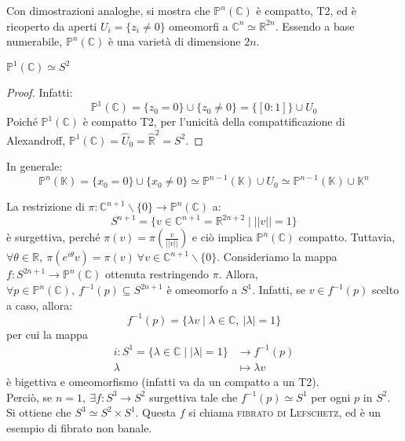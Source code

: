 Con dimostrazioni analoghe, si mostra che $\mathbb{P}^n(\mathbb{C})$ è compatto, T2, ed è ricoperto da aperti $U_i=\{z_i \neq 0\}$ omeomorfi a $\mathbb{C}^n \simeq \mathbb{R}^{2n}$. Essendo a base numerabile, $\mathbb{P}^n(\mathbb{C})$ è una varietà di dimensione $2n$.

\begin{prop}
$\mathbb{P}^1(\mathbb{C}) \simeq S^2$
\end{prop}
\begin{proof}
Infatti:
$$\mathbb{P}^1(\mathbb{C})=\{z_0=0\} \cup \{z_0 \neq 0\}=\{[0:1]\} \cup U_0$$
Poiché $\mathbb{P}^1(\mathbb{C})$ è compatto T2, per l'unicità della compattificazione di Alexandroff, $\mathbb{P}^1(\mathbb{C})=\hat{U}_0=\hat{\mathbb{R}}^2=S^2$.
\end{proof}

In generale:
$$\mathbb{P}^n(\mathbb{K})=\{x_0=0\} \cup \{x_0 \neq 0\} \simeq \mathbb{P}^{n-1}(\mathbb{K}) \cup U_0 \simeq \mathbb{P}^{n-1}(\mathbb{K}) \cup \mathbb{K}^n$$

\begin{ex}
La restrizione di $\pi :\mathbb{C}^{n+1} \smallsetminus \{0\} \rightarrow \mathbb{P}^n(\mathbb{C})$ a:
$$S^{n+1}=\{v \in \mathbb{C}^{n+1}=\mathbb{R}^{2n+2} \mid ||v||=1\}$$
è surgettiva, perché $\pi(v)=\pi(\frac{v}{||v||})$ e ciò implica $\mathbb{P}^n(\mathbb{C})$ compatto. Tuttavia, $\forall \theta \in \mathbb{R},\ \pi(e^{i\theta}v)=\pi(v) \ \forall v \in \mathbb{C}^{n+1} \smallsetminus \{0\}$. Consideriamo la mappa $f: S^{2n+1} \rightarrow \mathbb{P}^n(\mathbb{C})$ ottenuta restringendo $\pi$. Allora, $\forall p \in \mathbb{P}^n(\mathbb{C}),\ f^{-1}(p) \subseteq S^{2n+1}$ è omeomorfo a $S^1$. Infatti, se $v \in f^{-1}(p)$ scelto a caso, allora:
$$f^{-1}(p)=\{\lambda v \mid \lambda \in \mathbb{C},\ |\lambda|=1\}$$
per cui la mappa
\begin{align*}
i:S^1=\{\lambda \in \mathbb{C} \mid |\lambda|=1\} &\longrightarrow f^{-1}(p) \\
\lambda &\longmapsto \lambda v
\end{align*}
è bigettiva e omeomorfismo (infatti va da un compatto a un T2).\\
Perciò, se $n=1,\ \exists f:S^3 \rightarrow S^2$ surgettiva tale che $f^{-1}(p) \simeq S^1$ per ogni $p$ in $S^2$. Si ottiene che $S^3 \simeq S^2 \times S^1$. Questa $f$ si chiama \textsc{fibrato di Lefschetz}, ed è un esempio di fibrato non banale.
\end{ex}

